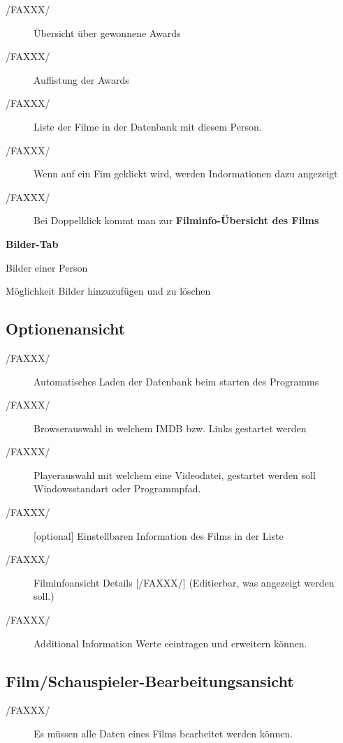\begin{description}
	\begin{description}
		\item[/FAXXX/] Übersicht über gewonnene Awards
		\item[/FAXXX/] Auflistung der Awards
		\item[/FAXXX/] Liste der Filme in der Datenbank mit diesem Person.
		\item[/FAXXX/]Wenn auf ein Fim geklickt wird, werden Indormationen dazu angezeigt
		\item[/FAXXX/] Bei Doppelklick kommt man zur \textbf{Filminfo-Übersicht des Films}
	\end{description}
	\item[/FAXXX/] \textbf{Bilder-Tab}
	\begin{description}
		\item Bilder einer Person
		\item Möglichkeit Bilder hinzuzufügen und zu löschen
	\end{description}
\end{description}

\newpage
\subsection{Optionenansicht}
\begin{description}
	\item[/FAXXX/] Automatisches Laden der Datenbank beim starten des Programms
	\item[/FAXXX/] Browserauswahl in welchem IMDB bzw. Links gestartet werden
	\item[/FAXXX/] Playerauswahl mit welchem eine Videodatei, gestartet werden soll Windowsstandart oder Programmpfad.
	\item[/FAXXX/] [optional] Einstellbaren Information des Films in der Liste
	\item[/FAXXX/] Filminfoansicht Details [/FAXXX/] (Editierbar, was angezeigt werden soll.)
	\item[/FAXXX/] Additional Information Werte eeintragen und erweitern können.
\end{description}

\subsection{Film/Schauspieler-Bearbeitungsansicht}
\begin{description}
	\item[/FAXXX/] Es müssen alle Daten eines Films bearbeitet werden können.
\end{description}

